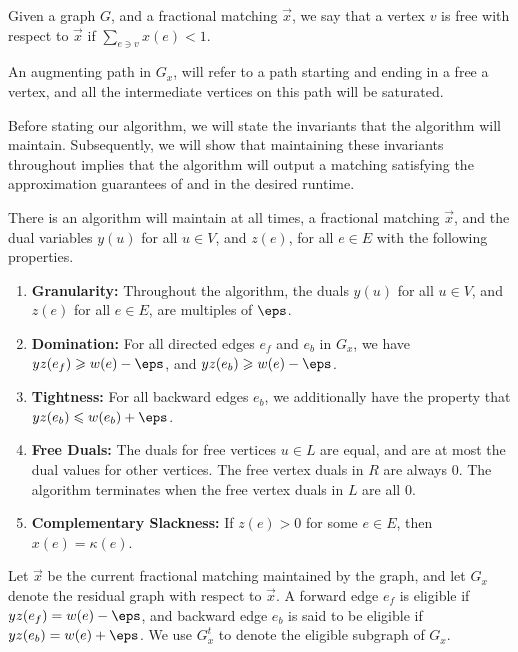 \begin{definition2}
Given a graph $G$, and a fractional matching $\vec{x}$, we say that a vertex $v$ is free with respect to $\vec{x}$ if $\sum_{e\ni v}x(e)<1$.
\end{definition2}

\begin{definition2}
    An augmenting path in $G_x$, will refer to a path starting and ending in a free a vertex, and all the intermediate vertices on this path will be saturated.
\end{definition2}

Before stating our algorithm, we will state the invariants that the algorithm will maintain. Subsequently, we will show that maintaining these invariants throughout implies that the algorithm will output a matching satisfying the approximation guarantees of  and in the desired runtime.

\begin{proposition}\label{prop:invariants}
There is an algorithm will maintain at all times, a fractional matching $\vec{x}$, and the dual variables $y(u)$ for all $u\in V$, and $z(e)$, for all $e\in E$ with the following properties.
\begin{enumerate}
    \item \textbf{Granularity:} Throughout the algorithm, the duals $y(u)$ for all $u\in V$, and $z(e)$ for all $e\in E$, are multiples of $\eps$. \label{item:gran}
    \item \textbf{Domination:} For all directed edges $e_f$ and $e_b$ in $G_{x}$, we have $yz(e_f)\geqslant w(e)-\eps$, and $yz(e_b)\geqslant w(e)-\eps$.\label{item:domin}
    \item \textbf{Tightness:} For all backward edges $e_b$, we additionally have the property that $yz(e_b)\leqslant w(e_b)+\eps$. \label{item:tightness}
    \item \textbf{Free Duals:} The duals for free vertices $u\in L$ are equal, and are at most the dual values for other vertices. The free vertex duals in $R$ are always $0$. The algorithm terminates when the free vertex duals in $L$ are all $0$. \label{item:freeduals}
    \item \textbf{Complementary Slackness:} If $z(e)>0$ for some $e\in E$, then $x(e)=\kappa(e)$. \label{item:slackness}
\end{enumerate}
\end{proposition}

\begin{definition2}
    Let $\vec{x}$ be the current fractional matching maintained by the graph, and let $G_{x}$ denote the residual graph with respect to $\vec{x}$. A forward edge $e_f$ is eligible if $yz(e_f) = w(e)-\eps$, and backward edge $e_b$ is said to be eligible if $yz(e_b)=w(e)+\eps$. We use $G^t_x$ to denote the eligible subgraph of $G_x$. 
\end{definition2}

